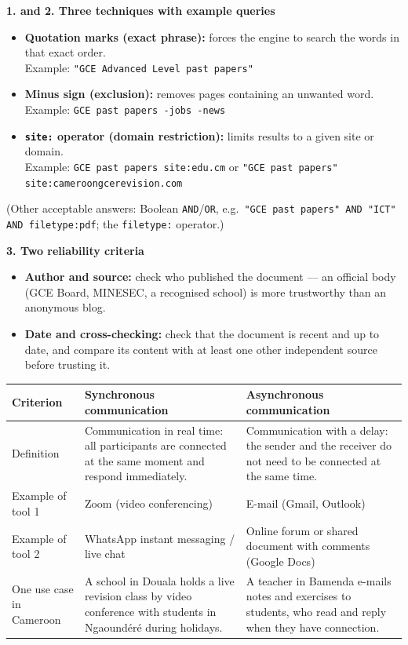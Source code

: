 \documentclass[11pt]{article}
\begin{document}
\begin{corrige}
\textbf{1. and 2. Three techniques with example queries}
\begin{itemize}
\item \textbf{Quotation marks (exact phrase):} forces the engine to search the words in that exact order.\\ Example: \texttt{"GCE Advanced Level past papers"}
\item \textbf{Minus sign (exclusion):} removes pages containing an unwanted word.\\ Example: \texttt{GCE past papers -jobs -news}
\item \textbf{\texttt{site:} operator (domain restriction):} limits results to a given site or domain.\\ Example: \texttt{GCE past papers site:edu.cm} \quad or \quad \texttt{"GCE past papers" site:cameroongcerevision.com}
\end{itemize}
(Other acceptable answers: Boolean \texttt{AND}/\texttt{OR}, e.g.\ \texttt{"GCE past papers" AND "ICT" AND filetype:pdf}; the \texttt{filetype:} operator.)

\textbf{3. Two reliability criteria}
\begin{itemize}
\item \textbf{Author and source:} check who published the document — an official body (GCE Board, MINESEC, a recognised school) is more trustworthy than an anonymous blog.
\item \textbf{Date and cross-checking:} check that the document is recent and up to date, and compare its content with at least one other independent source before trusting it.
\end{itemize}
\end{corrige}

\begin{corrige}
\begin{center}
\begin{tabularx}{\linewidth}{|l|X|X|}\hline
\rowcolor{popblueL} \textbf{Criterion} & \textbf{Synchronous communication} & \textbf{Asynchronous communication} \\ \hline
Definition & Communication in real time: all participants are connected at the same moment and respond immediately. & Communication with a delay: the sender and the receiver do not need to be connected at the same time. \\ \hline
Example of tool 1 & Zoom (video conferencing) & E-mail (Gmail, Outlook) \\ \hline
Example of tool 2 & WhatsApp instant messaging / live chat & Online forum or shared document with comments (Google Docs) \\ \hline
One use case in Cameroon & A school in Douala holds a live revision class by video conference with students in Ngaoundéré during holidays. & A teacher in Bamenda e-mails notes and exercises to students, who read and reply when they have connection. \\ \hline
\end{tabularx}
\end{center}
\end{corrige}
\end{document}
